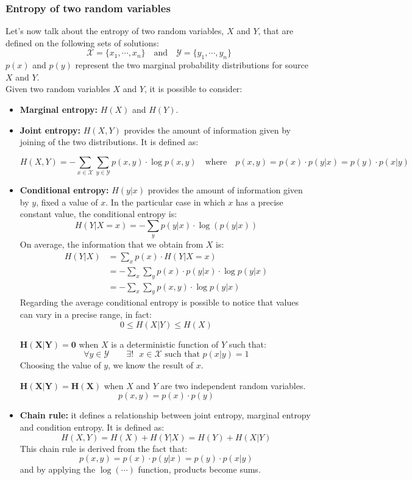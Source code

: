 \subsubsection{Entropy of two random variables} Let's now talk about the entropy of two random variables, $X$ and $Y$, that are defined on the following sets of solutions:
$$\mathcal{X} = \{x_1, \cdots, x_n\} \quad \text{and} \quad \mathcal{Y} = \{y_1, \cdots, y_n\}$$
$p(x)$ and $p(y)$ represent the two marginal probability distributions for source $X$ and $Y$.\\
Given two random variables $X$ and $Y$, it is possible to consider:
\begin{itemize}
	\item \textbf{Marginal entropy:} $H(X)$ and $H(Y)$.
	\item \textbf{Joint entropy:} $H(X, Y)$ provides the amount of information given by joining of the two distributions. It is defined as:
	
	$$H(X,Y) = -\sum_{x \in \mathcal{X}} \sum_{y \in \mathcal{Y}} p(x,y) \cdot \log p(x,y) \quad \text{where} \quad p(x,y) = p(x) \cdot p(y|x) = p(y) \cdot p(x|y)$$
	
	\item \textbf{Conditional entropy:} $H(y|x)$ provides the amount of information given by $y$, fixed a value of $x$. In the particular case in which $x$ has a precise constant value, the conditional entropy is:
	$$H(Y|X=x) = - \sum_y p(y|x) \cdot \log(p(y|x))$$
	On average, the information that we obtain from $X$ is:
	\begin{equation*}
	\begin{split}
	H(Y|X) &= \sum_x p(x) \cdot H(Y|X=x)\\
	&= - \sum_x \sum_y p(x) \cdot p(y|x) \cdot \log p(y|x)\\
	&= - \sum_x \sum_y p(x,y) \cdot \log p(y|x)		
	\end{split}
	\end{equation*}
	Regarding the average conditional entropy is possible to notice that values can vary in a precise range, in fact:
	$$0 \leq H(X|Y) \leq H(X)$$
	
	$\mathbf{H(X|Y) = 0}$ when $X$ is a deterministic function of $Y$ such that:
	$$\forall y \in \mathcal{Y} \qquad \exists!\text{ }x \in \mathcal{X} \text{ such that } p(x|y) = 1$$
	Choosing the value of $y$, we know the result of $x$. 
	
	$\mathbf{H(X|Y) = H(X)}$ when $X$ and $Y$ are two independent random variables.
	$$p(x,y) = p(x)\cdot p(y)$$
	\item \textbf{Chain rule:} it defines a relationship between joint entropy, marginal entropy and condition entropy. It is defined as:
	$$H(X,Y) = H(X) + H(Y|X) = H(Y) + H(X|Y)$$
	This chain rule is derived from the fact that:
	$$p(x,y) = p(x) \cdot p(y|x) = p(y) \cdot p(x|y)$$
	and by applying the $\log(\cdots)$ function, products become sums. 
\end{itemize} 

